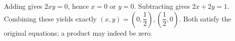 Adding gives $2xy=0$, hence $x=0$ or $y=0$. Subtracting gives $2x+2y=1$. Combining these yields exactly $\boxed{(x,y)=(0,\dfrac{1}{2}),(\dfrac{1}{2},0)}$. Both satisfy the original equations; a product may indeed be zero.
